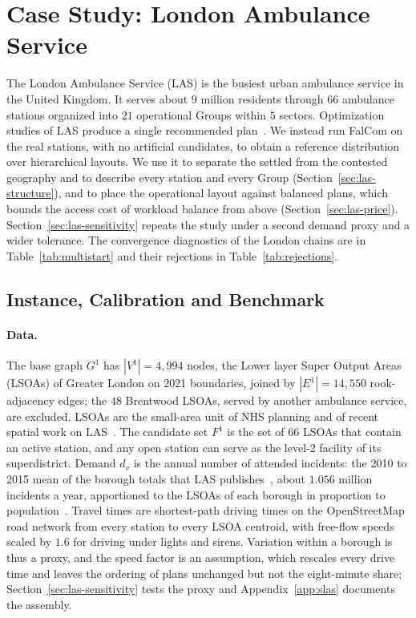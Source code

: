 \section{Case Study: London Ambulance Service}
\label{sec:exp-emergency}

The London Ambulance Service (LAS) is the busiest urban ambulance service in the United Kingdom. It serves about $9$ million residents through $66$ ambulance stations organized into $21$ operational Groups within $5$ sectors. Optimization studies of LAS produce a single recommended plan~\citep{mccormack2015simulation}. We instead run FalCom on the real stations, with no artificial candidates, to obtain a reference distribution over hierarchical layouts. We use it to separate the settled from the contested geography and to describe every station and every Group (Section~\ref{sec:las-structure}), and to place the operational layout against balanced plans, which bounds the access cost of workload balance from above (Section~\ref{sec:las-price}). Section~\ref{sec:las-sensitivity} repeats the study under a second demand proxy and a wider tolerance. The convergence diagnostics of the London chains are in Table~\ref{tab:multistart} and their rejections in Table~\ref{tab:rejections}.

\subsection{Instance, Calibration and Benchmark}\label{sec:las-data}

\paragraph{Data.}
The base graph $G^1$ has $|V^1| = 4{,}994$ nodes, the Lower layer Super Output Areas (LSOAs) of Greater London on 2021 boundaries, joined by $|E^1| = 14{,}550$ rook-adjacency edges; the $48$ Brentwood LSOAs, served by another ambulance service, are excluded. LSOAs are the small-area unit of NHS planning and of recent spatial work on LAS~\citep{murphy2024socio}. The candidate set $F^1$ is the set of $66$ LSOAs that contain an active station, and any open station can serve as the level-2 facility of its superdistrict. Demand $d_v$ is the annual number of attended incidents: the 2010 to 2015 mean of the borough totals that LAS publishes~\citep{las_incidents}, about $1.056$ million incidents a year, apportioned to the LSOAs of each borough in proportion to population~\citep{ons_sape2024}. Travel times are shortest-path driving times on the OpenStreetMap road network from every station to every LSOA centroid, with free-flow speeds scaled by $1.6$ for driving under lights and sirens. Variation within a borough is thus a proxy, and the speed factor is an assumption, which rescales every drive time and leaves the ordering of plans unchanged but not the eight-minute share; Section~\ref{sec:las-sensitivity} tests the proxy and Appendix~\ref{app:slas} documents the assembly.

